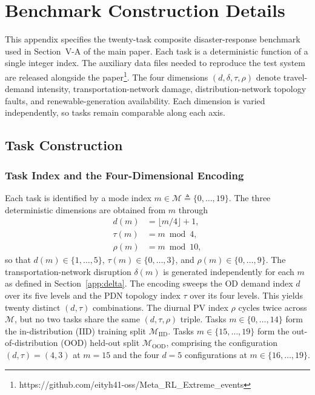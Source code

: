 \section*{Benchmark Construction Details}
\label{app:benchmark}

This appendix specifies the twenty-task composite disaster-response benchmark used in Section~V-A of the main paper. Each task is a deterministic function of a single integer index. The auxiliary data files needed to reproduce the test system are released alongside the paper\footnote{\label{fn:repo}https://github.com/eityh41-oss/Meta\_RL\_Extreme\_events}. The four dimensions $(d,\delta,\tau,\rho)$ denote travel-demand intensity, transportation-network damage, distribution-network topology faults, and renewable-generation availability. Each dimension is varied independently, so tasks remain comparable along each axis.

\subsection{Task Construction}
\label{app:tasks}

\subsubsection{Task Index and the Four-Dimensional Encoding}
\label{app:task_index}

Each task is identified by a mode index $m \in \mathcal{M} \triangleq \{0,\dots,19\}$. The three deterministic dimensions are obtained from $m$ through
\begin{equation}
\label{eq:app_task_mapping}
\begin{aligned}
d(m)    &= \lfloor m/4 \rfloor + 1, \\
\tau(m) &= m \bmod 4, \\
\rho(m) &= m \bmod 10,
\end{aligned}
\end{equation}
so that $d(m)\in\{1,\dots,5\}$, $\tau(m)\in\{0,\dots,3\}$, and $\rho(m)\in\{0,\dots,9\}$. The transportation-network disruption $\delta(m)$ is generated independently for each $m$ as defined in Section~\ref{app:delta}. The encoding sweeps the OD demand index $d$ over its five levels and the PDN topology index $\tau$ over its four levels. This yields twenty distinct $(d,\tau)$ combinations. The diurnal PV index $\rho$ cycles twice across $\mathcal{M}$, but no two tasks share the same $(d,\tau,\rho)$ triple. Tasks $m\in\{0,\dots,14\}$ form the in-distribution (IID) training split $\mathcal{M}_{\text{IID}}$. Tasks $m\in\{15,\dots,19\}$ form the out-of-distribution (OOD) held-out split $\mathcal{M}_{\text{OOD}}$, comprising the configuration $(d,\tau)=(4,3)$ at $m=15$ and the four $d=5$ configurations at $m\in\{16,\dots,19\}$.

